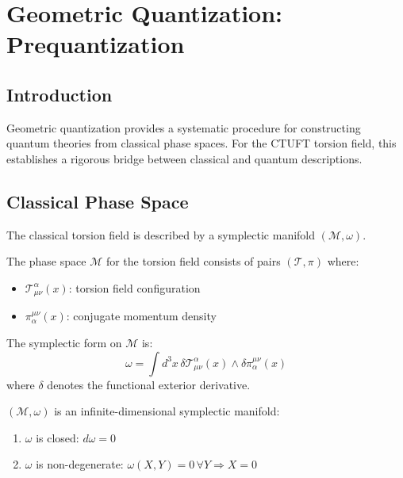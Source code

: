 \section{Geometric Quantization: Prequantization}
\label{sec:prequantization}

\subsection{Introduction}

Geometric quantization \cite{woodhouse1997} provides a systematic procedure for constructing quantum theories from classical phase spaces. For the CTUFT torsion field, this establishes a rigorous bridge between classical and quantum descriptions.

\subsection{Classical Phase Space}

The classical torsion field is described by a symplectic manifold $(\mathcal{M}, \omega)$.

\begin{definition}
The phase space $\mathcal{M}$ for the torsion field consists of pairs $(\mathcal{T}, \pi)$ where:
\begin{itemize}
    \item $\mathcal{T}^\alpha_{\mu\nu}(x)$: torsion field configuration
    \item $\pi_\alpha^{\mu\nu}(x)$: conjugate momentum density
\end{itemize}
\end{definition}

\begin{definition}
The symplectic form on $\mathcal{M}$ is:
\begin{equation}
    \omega = \int d^3x \, \delta \mathcal{T}^\alpha_{\mu\nu}(x) \wedge \delta \pi_\alpha^{\mu\nu}(x)
\end{equation}
where $\delta$ denotes the functional exterior derivative.
\end{definition}

\begin{theorem}
$(\mathcal{M}, \omega)$ is an infinite-dimensional symplectic manifold:
\begin{enumerate}
    \item $\omega$ is closed: $d\omega = 0$
    \item $\omega$ is non-degenerate: $\omega(X, Y) = 0 \, \forall Y \Rightarrow X = 0$
\end{enumerate}
\end{theorem}

